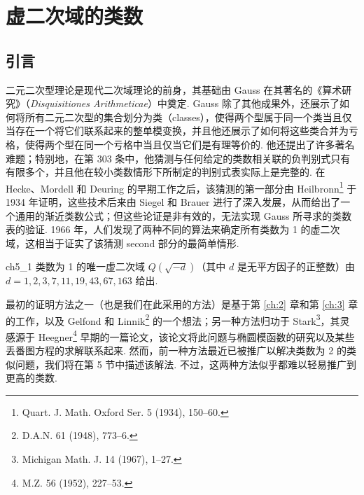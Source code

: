 
\chapter{虚二次域的类数}\label{ch:5}


\section{引言}\label{sec:ch5_1}

二元二次型理论是现代二次域理论的前身，其基础由 Gauss 在其著名的《算术研究》（\textit{Disquisitiones Arithmeticae}）中奠定. Gauss 除了其他成果外，还展示了如何将所有二元二次型的集合划分为类（classes），使得两个型属于同一个类当且仅当存在一个将它们联系起来的整单模变换，并且他还展示了如何将这些类合并为亏格，使得两个型在同一个亏格中当且仅当它们是有理等价的. 他还提出了许多著名难题；特别地，在第 303 条中，他猜测与任何给定的类数相关联的负判别式只有有限多个，并且他在较小类数情形下所制定的判别式表实际上是完整的. 在 Hecke、Mordell 和 Deuring 的早期工作之后，该猜测的第一部分由 Heilbronn\footnote{Quart. J. Math. Oxford Ser. 5 (1934), 150--60.} 于 1934 年证明，这些技术后来由 Siegel 和 Brauer 进行了深入发展，从而给出了一个通用的渐近类数公式；但这些论证是非有效的，无法实现 Gauss 所寻求的类数表的验证. 1966 年，人们发现了两种不同的算法来确定所有类数为 1 的虚二次域，这相当于证实了该猜测 second 部分的最简单情形.

\begin{mythm}{}{ch5_1}
类数为 1 的唯一虚二次域 $Q(\sqrt{-d})$（其中 $d$ 是无平方因子的正整数）由 $d = 1, 2, 3, 7, 11, 19, 43, 67, 163$ 给出.
\end{mythm}

最初的证明方法之一（也是我们在此采用的方法）是基于第 \ref{ch:2} 章和第 \ref{ch:3} 章的工作，以及 Gelfond 和 Linnik\footnote{D.A.N. 61 (1948), 773--6.} 的一个想法；另一种方法归功于 Stark\footnote{Michigan Math. J. 14 (1967), 1--27.}，其灵感源于 Heegner\footnote{M.Z. 56 (1952), 227--53.} 早期的一篇论文，该论文将此问题与椭圆模函数的研究以及某些丢番图方程的求解联系起来. 然而，前一种方法最近已被推广以解决类数为 2 的类似问题，我们将在第 5 节中描述该解法. 不过，这两种方法似乎都难以轻易推广到更高的类数.

